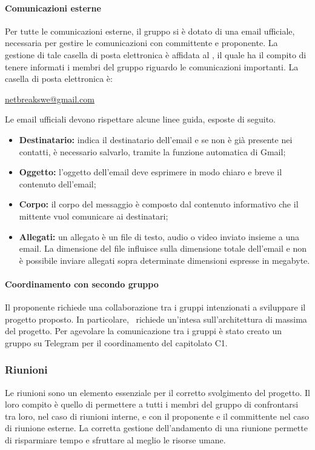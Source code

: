 			\paragraph{Comunicazioni esterne}
			Per tutte le comunicazioni esterne, il gruppo \textit{\gruppo} si è dotato di una email ufficiale, necessaria per gestire le comunicazioni con committente e proponente. La gestione di tale casella di posta elettronica è affidata al \textit{\RdP}, il quale ha il compito di tenere informati i membri del gruppo riguardo le comunicazioni importanti. La casella di posta elettronica è:
			\begin{center}
				\url{netbreakswe@gmail.com} 
			\end{center}
		Le email ufficiali devono rispettare alcune linee guida, esposte di seguito.
		\begin{itemize}
			\item \textbf{Destinatario:} indica il destinatario dell'email e se non è già presente nei contatti, è necessario salvarlo, tramite la funzione automatica di Gmail;
			\item \textbf{Oggetto:} l'oggetto dell'email deve esprimere in modo chiaro e breve il contenuto dell'email;
			\item \textbf{Corpo:} il corpo del messaggio è composto dal contenuto informativo che il mittente vuol comunicare ai destinatari;
			\item \textbf{Allegati:} un allegato è un file di testo, audio o video inviato insieme a una email. La dimensione del file influisce sulla dimensione totale dell'email e non è possibile inviare allegati sopra determinate dimensioni espresse in megabyte.
		\end{itemize}
		\paragraph{Coordinamento con secondo gruppo}
			Il proponente richiede una collaborazione tra i gruppi intenzionati a sviluppare il progetto proposto. In particolare, \proponente\ richiede un'intesa sull'architettura di massima del progetto. Per agevolare la comunicazione tra i gruppi è stato creato un gruppo su Telegram per il coordinamento del capitolato C1.
			
		\subsubsection{Riunioni}
		Le riunioni sono un elemento essenziale per il corretto svolgimento del progetto. Il loro compito è quello di permettere a tutti i membri del gruppo di confrontarsi tra loro, nel caso di riunioni interne, e con il proponente e il committente nel caso di riunione esterne. La corretta gestione dell'andamento di una riunione permette di risparmiare tempo e sfruttare al meglio le risorse umane.
		
